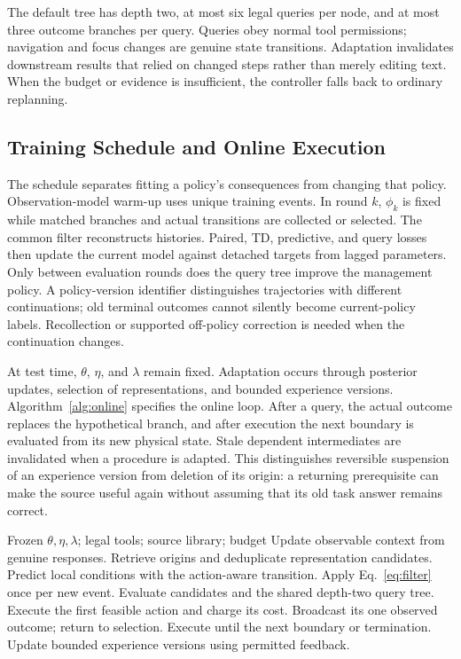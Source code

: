 \documentclass[sigconf,anonymous,review]{acmart}
\theoremstyle{zhplain}
\begin{document}
The default tree has depth two, at most six legal queries per node, and at most three outcome branches per query. Queries obey normal tool permissions; navigation and focus changes are genuine state transitions. Adaptation invalidates downstream results that relied on changed steps rather than merely editing text. When the budget or evidence is insufficient, the controller falls back to ordinary replanning.

\subsection{Training Schedule and Online Execution}
The schedule separates fitting a policy's consequences from changing that policy. Observation-model warm-up uses unique training events. In round \(k\), \(\phi_k\) is fixed while matched branches and actual transitions are collected or selected. The common filter reconstructs histories. Paired, TD, predictive, and query losses then update the current model against detached targets from lagged parameters. Only between evaluation rounds does the query tree improve the management policy. A policy-version identifier distinguishes trajectories with different continuations; old terminal outcomes cannot silently become current-policy labels. Recollection or supported off-policy correction is needed when the continuation changes.

At test time, \(\theta\), \(\eta\), and \(\lambda\) remain fixed. Adaptation occurs through posterior updates, selection of representations, and bounded experience versions. Algorithm~\ref{alg:online} specifies the online loop. After a query, the actual outcome replaces the hypothetical branch, and after execution the next boundary is evaluated from its new physical state. Stale dependent intermediates are invalidated when a procedure is adapted. This distinguishes reversible suspension of an experience version from deletion of its origin: a returning prerequisite can make the source useful again without assuming that its old task answer remains correct.

\begin{algorithm}[t]
\caption{DEUL online control}
\label{alg:online}
\begin{algorithmic}[1]
\Require Frozen \(\theta,\eta,\lambda\); legal tools; source library; budget
\State Update observable context from genuine responses.
\State Retrieve origins and deduplicate representation candidates.
\State Predict local conditions with the action-aware transition.
\State Apply Eq.~\eqref{eq:filter} once per new event.
\State Evaluate candidates and the shared depth-two query tree.
\State Execute the first feasible action and charge its cost.
\State Broadcast its one observed outcome; return to selection.
\Else
\State Execute until the next boundary or termination.
\EndIf
\EndWhile
\State Update bounded experience versions using permitted feedback.
\end{algorithmic}
\end{algorithm}
\end{document}
